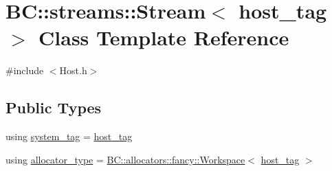 \hypertarget{classBC_1_1streams_1_1Stream_3_01host__tag_01_4}{}\section{BC\+:\+:streams\+:\+:Stream$<$ host\+\_\+tag $>$ Class Template Reference}
\label{classBC_1_1streams_1_1Stream_3_01host__tag_01_4}


{\ttfamily \#include $<$Host.\+h$>$}

\subsection*{Public Types}
\begin{DoxyCompactItemize}
\item 
using \hyperlink{classBC_1_1streams_1_1Stream_3_01host__tag_01_4_a056a3c93797a67838686ab1e0e895717}{system\+\_\+tag} = \hyperlink{structBC_1_1host__tag}{host\+\_\+tag}
\item 
using \hyperlink{classBC_1_1streams_1_1Stream_3_01host__tag_01_4_aefcc1433ff74449a35fbdabb9d1f487c}{allocator\+\_\+type} = \hyperlink{classBC_1_1allocators_1_1fancy_1_1Workspace}{B\+C\+::allocators\+::fancy\+::\+Workspace}$<$ \hyperlink{structBC_1_1host__tag}{host\+\_\+tag} $>$
\end{DoxyCompactItemize}
